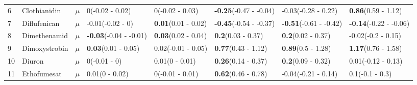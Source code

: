 \begin{longtable}{lp{2cm}p{0.7cm}p{2cm}p{2cm}p{2cm}p{2cm}p{2cm}}
  6 & Clothianidin & $\mu$ & 0\newline (-0.02 - 0.02) & 0\newline (-0.02 - 0.03) & \textbf{-0.25}\newline (-0.47 - -0.04) & -0.03\newline (-0.28 - 0.22) & \textbf{0.86}\newline (0.59 - 1.12) \\ 
  7 & Diflufenican & $\mu$ & -0.01\newline (-0.02 - 0) & \textbf{0.01}\newline (0.01 - 0.02) & \textbf{-0.45}\newline (-0.54 - -0.37) & \textbf{-0.51}\newline (-0.61 - -0.42) & \textbf{-0.14}\newline (-0.22 - -0.06) \\ 
  8 & Dimethenamid & $\mu$ & \textbf{-0.03}\newline (-0.04 - -0.01) & \textbf{0.03}\newline (0.02 - 0.04) & \textbf{0.2}\newline (0.03 - 0.37) & \textbf{0.2}\newline (0.02 - 0.37) & -0.02\newline (-0.2 - 0.15) \\ 
  9 & Dimoxystrobin & $\mu$ & \textbf{0.03}\newline (0.01 - 0.05) & 0.02\newline (-0.01 - 0.05) & \textbf{0.77}\newline (0.43 - 1.12) & \textbf{0.89}\newline (0.5 - 1.28) & \textbf{1.17}\newline (0.76 - 1.58) \\ 
  10 & Diuron & $\mu$ & 0\newline (-0.01 - 0) & 0.01\newline (0 - 0.01) & \textbf{0.26}\newline (0.14 - 0.37) & \textbf{0.2}\newline (0.09 - 0.32) & 0.01\newline (-0.12 - 0.13) \\ 
  11 & Ethofumesat & $\mu$ & 0.01\newline (0 - 0.02) & 0\newline (-0.01 - 0.01) & \textbf{0.62}\newline (0.46 - 0.78) & -0.04\newline (-0.21 - 0.14) & 0.1\newline (-0.1 - 0.3) \\ 

\end{longtable}

